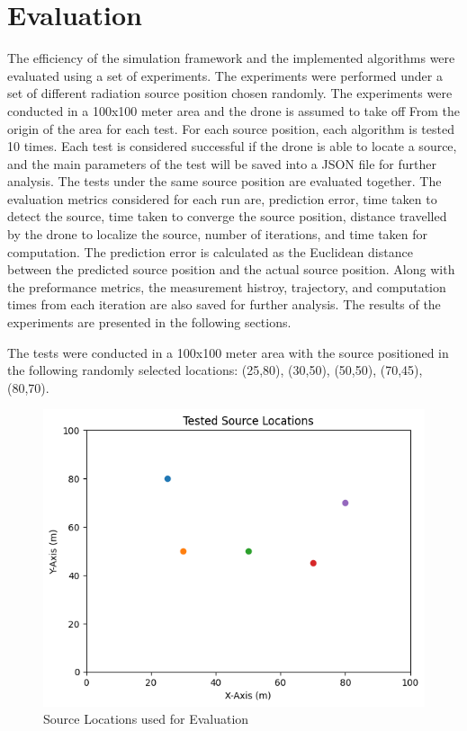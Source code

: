 \documentclass[../report.tex]{subfiles}
\begin{document}
    \section{Evaluation}
    \label{sec:evaluation}

    The efficiency of the simulation framework and the implemented algorithms were evaluated using a set of experiments. The experiments were performed under a 
    set of different radiation source position chosen randomly. The experiments were conducted in a 100x100 meter area and the drone is assumed to take off From
    the origin of the area for each test. For each source position, each algorithm is tested 10 times. Each test is considered successful if the drone is able to 
    locate a source, and the main parameters of the test will be saved into a JSON file for further analysis.  The tests under the same source position are evaluated
    together. The evaluation metrics considered for each run are, prediction error, time taken to detect the source, time taken to converge the source position, 
    distance travelled by the drone to localize the source, number of iterations, and time taken for computation. The prediction error is calculated as the Euclidean
    distance between the predicted source position and the actual source position. Along with the preformance metrics, the measurement histroy, trajectory, and computation times from each 
    iteration are also saved for further analysis. The results of the experiments are presented in the following sections.


    The tests were conducted in a 100x100 meter area with the source positioned in the following randomly selected locations: (25,80), (30,50), (50,50), (70,45), (80,70).
    \begin{figure}[ht]
        \centering
        \includegraphics[width=0.8\linewidth]{figures/source_locations.png}
        \caption{Source Locations used for Evaluation}
        \label{fig:figureexample}
    \end{figure}
\end{document}
